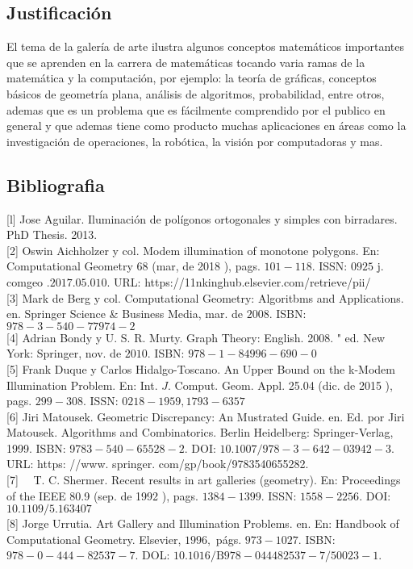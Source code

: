 \subsection*{Justificación}
El tema de la galería de arte ilustra algunos conceptos matemáticos importantes
que se aprenden en la carrera de matemáticas tocando varia ramas de la
matemática y la computación, por ejemplo: la teoría de gráficas, conceptos
básicos de geometría plana, análisis de algoritmos, probabilidad, entre otros,
ademas que es un problema que es fácilmente comprendido por el publico en
general y que ademas tiene como producto muchas aplicaciones en áreas como la
investigación de operaciones, la robótica, la visión por computadoras y mas.

\subsection*{Bibliografia}


[l] Jose Aguilar. Iluminación de polígonos ortogonales y simples con birradares.
PhD Thesis. 2013.\\

[2] Oswin Aichholzer y col. Modem illumination of monotone polygons. En:
Computational Geometry 68 (mar, de 2018 ), pags. $101-118 .$ ISSN: $0925$ j.
comgeo $.2017 .05 .010 .$ URL: https://11nkinghub.elsevier.com/retrieve/pii/\\

[3] Mark de Berg y col. Computational Geometry: Algoritbms and Applications. en.
Springer Science \& Business Media, mar. de $2008 .$ ISBN: $978-3-540-77974-2$\\

[4] Adrian Bondy y U. S. R. Murty. Graph Theory: English. 2008. " ed. New York:
Springer, nov. de $2010 .$ ISBN: $978-1-84996-690-0$\\

[5] Frank Duque y Carlos Hidalgo-Toscano. An Upper Bound on the k-Modem
Illumination Problem. En: Int. $J$. Comput. Geom. Appl. 25.04 (dic. de 2015
), pags. $299-308$. ISSN: $0218-1959,1793-6357$\\

[6] Jiri Matousek. Geometric Discrepancy: An Mustrated Guide. en. Ed. por Jiri
Matousek. Algorithms and Combinatorics. Berlin Heidelberg: Springer-Verlag,
1999. ISBN: 978$3-540-65528-2 .$ DOI: $10.1007 / 978-3-642-03942-3 .$ URL:
https: //www. springer. com/gp/book/9783540655282.\\

[7]$\quad$ T. C. Shermer. Recent results in art galleries (geometry). En:
Proceedings of the IEEE 80.9 (sep. de 1992 ), pags. $1384-1399 .$ ISSN:
$1558-2256 .$ DOI: $10.1109 / 5.163407$\\

[8] Jorge Urrutia. Art Gallery and Illumination Problems. en. En: Handbook of
Computational Geometry. Elsevier, $1996,$ págs. $973-1027 .$ ISBN:
$978-0-444-82537-7 .$ DOL: $10.1016 / \mathrm{B} 978-044482537-7 / 50023-1 .$\\